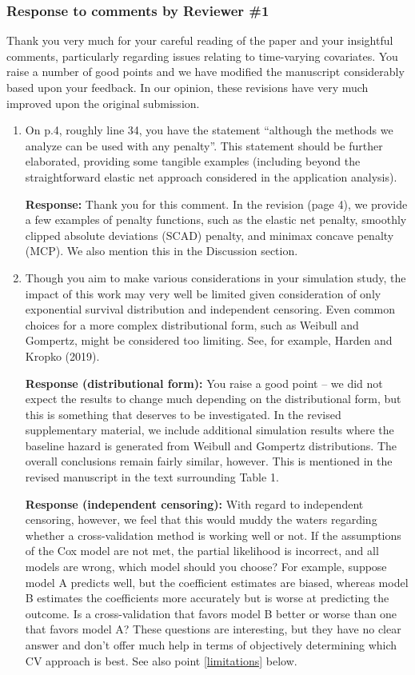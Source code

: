 \documentclass[12]{article}
\newcommand{\re}{\textbf{Response: }}
\begin{document}
\subsubsection*{Response to comments by Reviewer \#1}

Thank you very much for your careful reading of the paper and your insightful comments, particularly regarding issues relating to time-varying covariates. You raise a number of good points and we have modified the manuscript considerably based upon your feedback.  In our opinion, these revisions have very much improved upon the original submission.

\begin{enumerate}[align = left]
\item On p.4, roughly line 34, you have the statement “although the methods we analyze can be used with any penalty”.  This statement should be further elaborated, providing some tangible examples (including beyond the straightforward elastic net approach considered in the application analysis).

\re Thank you for this comment. In the revision (page 4), we provide a few examples of penalty functions, such as the elastic net penalty, smoothly clipped absolute deviations (SCAD) penalty, and minimax concave penalty (MCP). We also mention this in the Discussion section.

\item Though you aim to make various considerations in your simulation study, the impact of this work may very well be limited given consideration of only exponential survival distribution and independent censoring. Even common choices for a more complex distributional form, such as Weibull and Gompertz, might be considered too limiting. See, for example, Harden and Kropko (2019).

\textbf{Response (distributional form):} You raise a good point -- we did not expect the results to change much depending on the distributional form, but this is something that deserves to be investigated. In the revised supplementary material, we include additional simulation results where the baseline hazard is generated from Weibull and Gompertz distributions. The overall conclusions remain fairly similar, however. This is mentioned in the revised manuscript in the text surrounding Table 1.

\textbf{Response (independent censoring):} With regard to independent censoring, however, we feel that this would muddy the waters regarding whether a cross-validation method is working well or not. If the assumptions of the Cox model are not met, the partial likelihood is incorrect, and all models are wrong, which model should you choose? For example, suppose model A predicts well, but the coefficient estimates are biased, whereas model B estimates the coefficients more accurately but is worse at predicting the outcome. Is a cross-validation that favors model B better or worse than one that favors model A? These questions are interesting, but they have no clear answer and don't offer much help in terms of objectively determining which CV approach is best. See also point \ref{limitations} below.


\end{enumerate}
\end{document}
